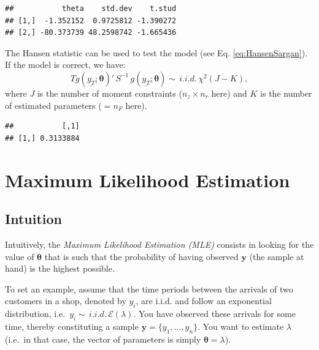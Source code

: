 \documentclass[
  12pt,
]{book}
\newenvironment{Shaded}{\begin{snugshade}}{\end{snugshade}}
\newcommand{\AttributeTok}[1]{\textcolor[rgb]{0.13,0.29,0.53}{#1}}
\newcommand{\FunctionTok}[1]{\textcolor[rgb]{0.13,0.29,0.53}{\textbf{#1}}}
\newcommand{\NormalTok}[1]{#1}
\newcommand{\OtherTok}[1]{\textcolor[rgb]{0.56,0.35,0.01}{#1}}
\newcommand{\SpecialCharTok}[1]{\textcolor[rgb]{0.81,0.36,0.00}{\textbf{#1}}}
\theoremstyle{definition}
\theoremstyle{definition}
\theoremstyle{definition}
\theoremstyle{definition}
\theoremstyle{remark}
\begin{document}
\begin{verbatim}
##           theta    std.dev    t.stud
## [1,]  -1.352152  0.9725812 -1.390272
## [2,] -80.373739 48.2598742 -1.665436
\end{verbatim}

The Hansen statistic can be used to test the model (see Eq. \eqref{eq:HansenSargan}). If the model is correct, we have:
\[
T g(\underline{y_T};{\boldsymbol\theta})'\, S^{-1} \, g(\underline{y_T};{\boldsymbol\theta}) \sim \,i.i.d.\,\chi^2(J - K),
\]
where \(J\) is the number of moment constraints (\(n_z \times n_r\) here) and \(K\) is the number of estimated parameters (\(=n_F\) here).

\begin{Shaded}
\end{Shaded}

\begin{verbatim}
##           [,1]
## [1,] 0.3133884
\end{verbatim}

\hypertarget{secMLE}{%
\section{Maximum Likelihood Estimation}\label{secMLE}}

\hypertarget{intuition}{%
\subsection{Intuition}\label{intuition}}

Intuitively, the \emph{Maximum Likelihood Estimation (MLE)} consists in looking for the value of \({\boldsymbol\theta}\) that is such that the probability of having observed \(\mathbf{y}\) (the sample at hand) is the highest possible.

To set an example, assume that the time periods between the arrivals of two customers in a shop, denoted by \(y_i\), are i.i.d. and follow an exponential distribution, i.e.~\(y_i \sim \,i.i.d.\, \mathcal{E}(\lambda)\). You have observed these arrivals for some time, thereby constituting a sample \(\mathbf{y}=\{y_1,\dots,y_n\}\). You want to estimate \(\lambda\) (i.e.~in that case, the vector of parameters is simply \({\boldsymbol\theta} = \lambda\)).
\end{document}
